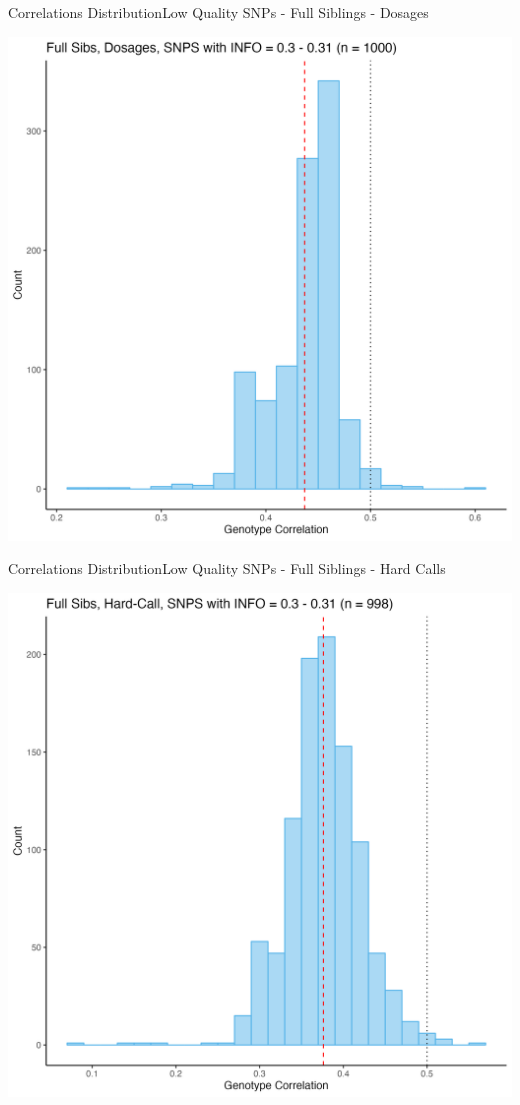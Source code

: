 \documentclass{beamer}
\begin{document}
\begin{frame}{Correlations Distribution}{Low Quality SNPs - Full Siblings - Dosages}
      
      \centering         
      \includegraphics[width= .7\textwidth]{fig/FS-DSG-i30.png}
      
\end{frame}



\begin{frame}{Correlations Distribution}{Low Quality SNPs - Full Siblings - Hard Calls}
      
      \centering      
      \includegraphics[width= .7\textwidth]{fig/FS-HC-i30.png}
            
\end{frame}

\end{document}
